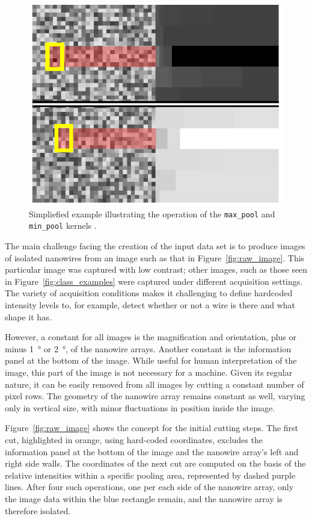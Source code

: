 \begin{figure}
    \centering
    \includegraphics{5_Yield_Analysis/Fig/min_max_pool.pdf}
    \caption[Simpliefied example illustrating the operation of the \texttt{max\_pool} and \texttt{min\_pool} kernels.]{Simpliefied example illustrating the operation of the \texttt{max\_pool} and \texttt{min\_pool} kernels \cite{Brugnolotto2024}.}
    \label{fig:min_max_pool}
\end{figure}

The main challenge facing the creation of the input data set is to produce images of isolated nanowires from an image such as that in Figure~\ref{fig:raw_image}. This particular image was captured with low contrast; other images, such as those seen in Figure~\ref{fig:class_examples} were captured under different acquisition settings. The variety of acquisition conditions makes it challenging to define hardcoded intensity levels to, for example, detect whether or not a wire is there and what shape it has.

However, a constant for all images is the magnification and orientation, plus or minus \qty{1}{\degree} or \qty{2}{\degree}, of the nanowire arrays. Another constant is the information panel at the bottom of the image. While useful for human interpretation of the image, this part of the image is not necessary for a machine. Given its regular nature, it can be easily removed from all images by cutting a constant number of pixel rows. The geometry of the nanowire array remains constant as well, varying only in vertical size, with minor fluctuations in position inside the image.

Figure~\ref{fig:raw_image} shows the concept for the initial cutting steps. The first cut, highlighted in orange, using hard-coded coordinates, excludes the information panel at the bottom of the image and the nanowire array's left and right side walls. The coordinates of the next cut are computed on the basis of the relative intensities within a specific pooling area, represented by dashed purple lines. After four such operations, one per each side of the nanowire array, only the image data within the blue rectangle remain, and the nanowire array is therefore isolated.

